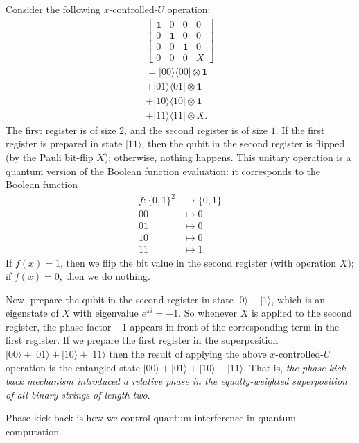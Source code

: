 \documentclass[fleqn]{article}
\newenvironment{idea}{\noindent}{\medskip}
\begin{document}
Consider the following \(x\)-controlled-\(U\) operation:
\[
  \begin{gathered}
    \left[
      \begin{array}{cccc}
        \mathbf{1}& 0 & 0 & 0
      \\0 & \mathbf{1}& 0 & 0
      \\0 & 0 & \mathbf{1}& 0
      \\0 & 0 & 0 & X
      \end{array}
    \right]
  \\[1em]
    =|00\rangle\langle 00|\otimes\mathbf{1}
  \\+ |01\rangle\langle 01|\otimes\mathbf{1}
  \\+ |10\rangle\langle 10|\otimes\mathbf{1}
  \\+ |11\rangle\langle 11|\otimes X.
  \end{gathered}
\]
The first register is of size \(2\), and the second register is of size \(1\).
If the first register is prepared in state \(|11\rangle\), then the qubit in the second register is flipped (by the Pauli bit-flip \(X\)); otherwise, nothing happens.
This unitary operation is a quantum version of the Boolean function evaluation: it corresponds to the Boolean function
\[
  \begin{aligned}
    f\colon\{0,1\}^2 &\to \{0,1\}
  \\00&\mapsto0
  \\01&\mapsto0
  \\10&\mapsto0
  \\11&\mapsto1.
  \end{aligned}
\]
If \(f(x)=1\), then we flip the bit value in the second register (with operation \(X\)); if \(f(x)=0\), then we do nothing.

Now, prepare the qubit in the second register in state \(|0\rangle-|1\rangle\), which is an eigenstate of \(X\) with eigenvalue \(e^{\pi i}=-1\).
So whenever \(X\) is applied to the second register, the phase factor \(-1\) appears in front of the corresponding term in the first register.
If we prepare the first register in the superposition \(|00\rangle+|01\rangle+|10\rangle+|11\rangle\) then the result of applying the above \(x\)-controlled-\(U\) operation is the entangled state \(|00\rangle+|01\rangle+|10\rangle-|11\rangle\).
That is, \emph{the phase kick-back mechanism introduced a relative phase in the equally-weighted superposition of all binary strings of length two}.

\begin{idea}
Phase kick-back is how we control quantum interference in quantum computation.

\end{idea}
\end{document}
